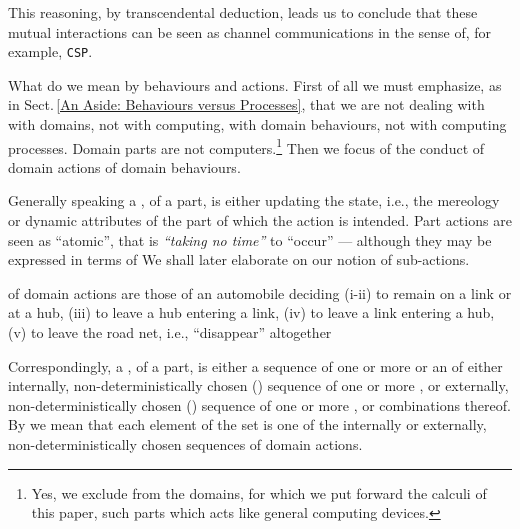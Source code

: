 \pind This reasoning, by transcendental deduction, leads us to conclude
\begynd
\pind that these mutual interactions 
\pind can be seen as channel communications
\pind in the sense of, for example, \texttt{CSP}.
\afslut
\afslut



\begynd
\pind What do we mean by behaviours and actions.
\begynd
\pind First of all we must emphasize, as in Sect.\,\vref{An Aside: Behaviours versus Processes},
\begynd
\pind that we are not dealing with with domains, not with computing, 
\pind with domain behaviours, not with computing processes.
\pind Domain parts are not computers.\footnote{Yes, we exclude
      from the domains, for which we put forward the calculi of this
      paper, such parts which acts like general computing devices.}
\afslut 
\pind Then we focus of the conduct of domain actions of domain
behaviours.

\pind Generally speaking a ,   of a part, is
\begynd
\pind either updating the state, 
\pind i.e., the mereology or dynamic attributes 
\pind of the part
\pind of which the action is intended.
\afslut
\pind Part actions are seen as ``atomic'',
\begynd
\pind that is \textsl{``taking no time''} to ``occur'' ---
\pind although they may be expressed in terms of 
\pind We shall later elaborate on our notion of sub-actions.
\afslut

\pind {} of domain actions are those of an automobile deciding
\begynd
\pind (i-ii) to remain on a link or at a hub,
\pind (iii) to leave a hub entering a link,
\pind (iv) to leave a link entering a hub,
\pind (v) to leave the road net, i.e., ``disappear'' altogether\dbsquare\
\afslut

\pind Correspondingly, a , of a part, is
\begynd
\pind either a sequence of one or more  
\pind or an \sfsl{``alternative'' set} of
\begynd
\pind either internally, non-deterministically chosen (\NONDETCHOICE) sequence of  one
      or more ,
\pind or externally,  non-deterministically chosen (\DETCHOICE) sequence of one or
      more \sfsl{domain actions}, 
\pind or combinations thereof.
\afslut
\pind By  we mean
\begynd
\pind that each element of the set is one of 
\pind the  internally or externally, non-deterministically 
\pind chosen sequences of domain actions.
\afslut
\afslut
\afslut
\afslut

